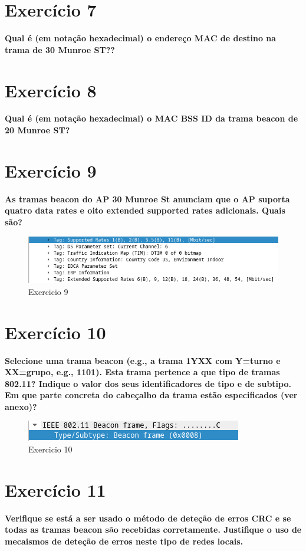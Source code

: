 \documentclass[a4paper]{report}
\begin{document}
\section{Exercício 7}
\textbf{Qual é (em notação hexadecimal) o endereço MAC de destino na trama de 30
    Munroe ST??}

\section{Exercício 8}
\textbf{Qual é (em notação hexadecimal) o MAC BSS ID da trama beacon de 20
    Munroe ST?}

\section{Exercício 9}
\textbf{As tramas beacon do AP 30 Munroe St anunciam que o AP suporta quatro
    data rates e oito extended supported rates adicionais. Quais são?}
\begin{figure}[H]
    \centering 
    \includegraphics[width=\textwidth]{images/ex9.png}  
    \caption{Exercicio 9}
    \label{fig:ex9}
\end{figure}

\section{Exercício 10}
\textbf{Selecione uma trama beacon (e.g., a trama 1YXX com Y=turno e XX=grupo,
    e.g., 1101). Esta trama pertence a que tipo de tramas 802.11? Indique o
    valor dos seus identificadores de tipo e de subtipo. Em que parte concreta
    do cabeçalho da trama estão especificados (ver anexo)?}

\begin{figure}[H]
    \centering 
    \includegraphics[width=\textwidth]{images/ex10.png}  
    \caption{Exercicio 10}
    \label{fig:ex10}
\end{figure}

\section{Exercício 11}
\textbf{Verifique se está a ser usado o método de deteção de erros CRC e se
    todas as tramas beacon são recebidas corretamente. Justifique o uso de
    mecaismos de deteção de erros neste tipo de redes locais.}
\end{document}
